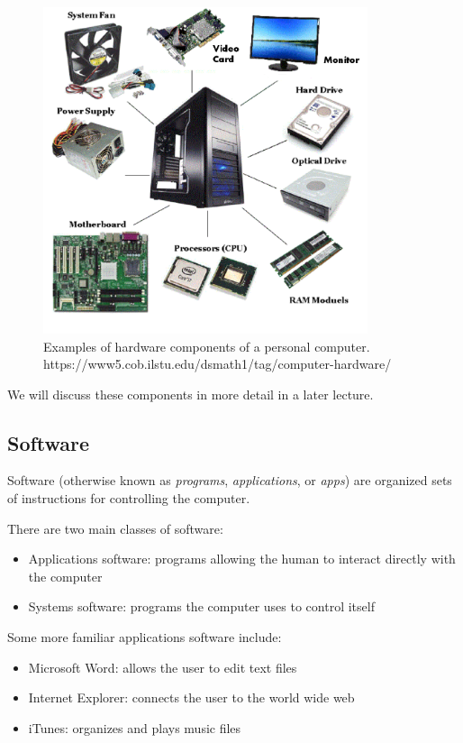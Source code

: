 \begin{figure}
	\centering
	\includegraphics[width=0.85\textwidth]{images/hardware.png}
	\caption{Examples of hardware components of a personal computer. https://www5.cob.ilstu.edu/dsmath1/tag/computer-hardware/}
	\label{fig:hardware}
\end{figure}

We will discuss these components in more detail in a later lecture. 

\subsection{Software}

Software (otherwise known as \textit{programs}, \textit{applications}, or \textit{apps}) are organized sets of instructions for controlling the computer.

There are two main classes of software:

\begin{itemize}
	\item Applications software: programs allowing the human to interact directly with the computer
	\item Systems software: programs the computer uses to control itself
\end{itemize}

Some more familiar applications software include:

\begin{itemize}
	\item Microsoft Word: allows the user to edit text files
	\item Internet Explorer: connects the user to the world wide web
	\item iTunes: organizes and plays music files
\end{itemize}

